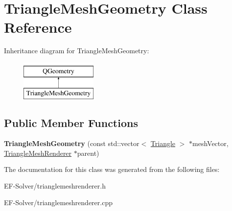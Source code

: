 \hypertarget{class_triangle_mesh_geometry}{}\section{Triangle\+Mesh\+Geometry Class Reference}
\label{class_triangle_mesh_geometry}
Inheritance diagram for Triangle\+Mesh\+Geometry\+:\begin{figure}[H]
\begin{center}
\leavevmode
\includegraphics[height=2.000000cm]{class_triangle_mesh_geometry}
\end{center}
\end{figure}
\subsection*{Public Member Functions}
\begin{DoxyCompactItemize}
\item 
{\bfseries Triangle\+Mesh\+Geometry} (const std\+::vector$<$ \hyperlink{struct_triangle}{Triangle} $>$ $\ast$mesh\+Vector, \hyperlink{class_triangle_mesh_renderer}{Triangle\+Mesh\+Renderer} $\ast$parent)\hypertarget{class_triangle_mesh_geometry_a1957684e0853c59015cde9ee1cd05447}{}\label{class_triangle_mesh_geometry_a1957684e0853c59015cde9ee1cd05447}

\end{DoxyCompactItemize}


The documentation for this class was generated from the following files\+:\begin{DoxyCompactItemize}
\item 
E\+F-\/\+Solver/trianglemeshrenderer.\+h\item 
E\+F-\/\+Solver/trianglemeshrenderer.\+cpp\end{DoxyCompactItemize}
